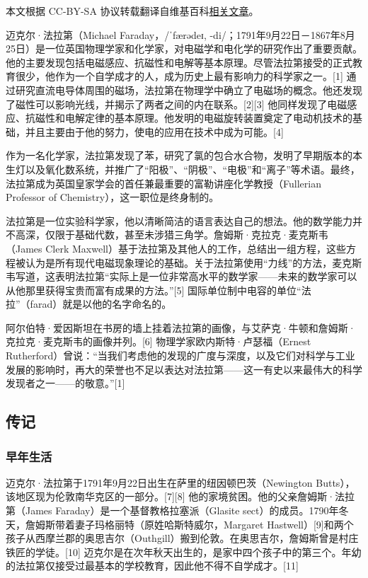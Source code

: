 
本文根据 CC-BY-SA 协议转载翻译自维基百科\href{https://en.wikipedia.org/wiki/Michael_Faraday}{相关文章}。

迈克尔·法拉第（Michael Faraday，/ˈfærədeɪ, -di/；1791年9月22日－1867年8月25日）是一位英国物理学家和化学家，对电磁学和电化学的研究作出了重要贡献。他的主要发现包括电磁感应、抗磁性和电解等基本原理。尽管法拉第接受的正式教育很少，他作为一个自学成才的人，成为历史上最有影响力的科学家之一。[1] 通过研究直流电导体周围的磁场，法拉第在物理学中确立了电磁场的概念。他还发现了磁性可以影响光线，并揭示了两者之间的内在联系。[2][3] 他同样发现了电磁感应、抗磁性和电解定律的基本原理。他发明的电磁旋转装置奠定了电动机技术的基础，并且主要由于他的努力，使电的应用在技术中成为可能。[4]

作为一名化学家，法拉第发现了苯，研究了氯的包合水合物，发明了早期版本的本生灯以及氧化数系统，并推广了“阳极”、“阴极”、“电极”和“离子”等术语。最终，法拉第成为英国皇家学会的首任兼最重要的富勒讲座化学教授（Fullerian Professor of Chemistry），这一职位是终身制的。

法拉第是一位实验科学家，他以清晰简洁的语言表达自己的想法。他的数学能力并不高深，仅限于基础代数，甚至未涉猎三角学。詹姆斯·克拉克·麦克斯韦（James Clerk Maxwell）基于法拉第及其他人的工作，总结出一组方程，这些方程被认为是所有现代电磁现象理论的基础。关于法拉第使用“力线”的方法，麦克斯韦写道，这表明法拉第“实际上是一位非常高水平的数学家——未来的数学家可以从他那里获得宝贵而富有成果的方法。”[5] 国际单位制中电容的单位“法拉”（farad）就是以他的名字命名的。

阿尔伯特·爱因斯坦在书房的墙上挂着法拉第的画像，与艾萨克·牛顿和詹姆斯·克拉克·麦克斯韦的画像并列。[6] 物理学家欧内斯特·卢瑟福（Ernest Rutherford）曾说：“当我们考虑他的发现的广度与深度，以及它们对科学与工业发展的影响时，再大的荣誉也不足以表达对法拉第——这一有史以来最伟大的科学发现者之一——的敬意。”[1]
\subsection{传记}
\subsubsection{早年生活}
迈克尔·法拉第于1791年9月22日出生在萨里的纽因顿巴茨（Newington Butts），该地区现为伦敦南华克区的一部分。[7][8] 他的家境贫困。他的父亲詹姆斯·法拉第（James Faraday）是一个基督教格拉塞派（Glasite sect）的成员。1790年冬天，詹姆斯带着妻子玛格丽特（原姓哈斯特威尔，Margaret Hastwell）[9]和两个孩子从西摩兰郡的奥思吉尔（Outhgill）搬到伦敦。在奥思吉尔，詹姆斯曾是村庄铁匠的学徒。[10] 迈克尔是在次年秋天出生的，是家中四个孩子中的第三个。年幼的法拉第仅接受过最基本的学校教育，因此他不得不自学成才。[11]

